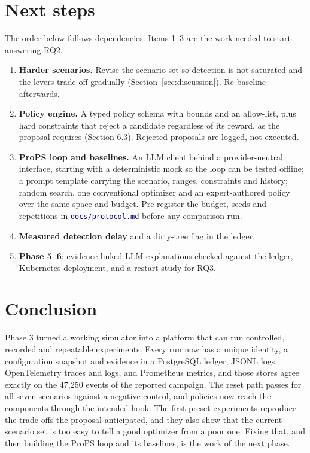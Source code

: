 \documentclass[11pt]{article}
\newcommand{\file}[1]{\textcolor{navy}{\texttt{\small #1}}}
\begin{document}
\section{Next steps}
\label{sec:next}
The order below follows dependencies. Items 1--3 are the work needed to start
answering RQ2.
\begin{enumerate}[leftmargin=1.6em,itemsep=2pt]
\item \textbf{Harder scenarios.} Revise the scenario set so detection is not
saturated and the levers trade off gradually (Section~\ref{sec:discussion}).
Re-baseline afterwards.
\item \textbf{Policy engine.} A typed policy schema with bounds and an allow-list,
plus hard constraints that reject a candidate regardless of its reward, as the
proposal requires (Section 6.3). Rejected proposals are logged, not executed.
\item \textbf{ProPS loop and baselines.} An LLM client behind a provider-neutral
interface, starting with a deterministic mock so the loop can be tested offline;
a prompt template carrying the scenario, ranges, constraints and history; random
search, one conventional optimizer and an expert-authored policy over the same
space and budget. Pre-register the budget, seeds and repetitions in
\file{docs/protocol.md} before any comparison run.
\item \textbf{Measured detection delay} and a dirty-tree flag in the ledger.
\item \textbf{Phase 5--6}: evidence-linked LLM explanations checked against the
ledger, Kubernetes deployment, and a restart study for RQ3.
\end{enumerate}

\section{Conclusion}
Phase 3 turned a working simulator into a platform that can run controlled,
recorded and repeatable experiments. Every run now has a unique identity, a
configuration snapshot and evidence in a PostgreSQL ledger, JSONL logs,
OpenTelemetry traces and logs, and Prometheus metrics, and those stores agree
exactly on the 47{,}250 events of the reported campaign. The reset path passes
for all seven scenarios against a negative control, and policies now reach the
components through the intended hook. The first preset experiments reproduce the
trade-offs the proposal anticipated, and they also show that the current scenario
set is too easy to tell a good optimizer from a poor one. Fixing that, and then
building the ProPS loop and its baselines, is the work of the next phase.
\end{document}

